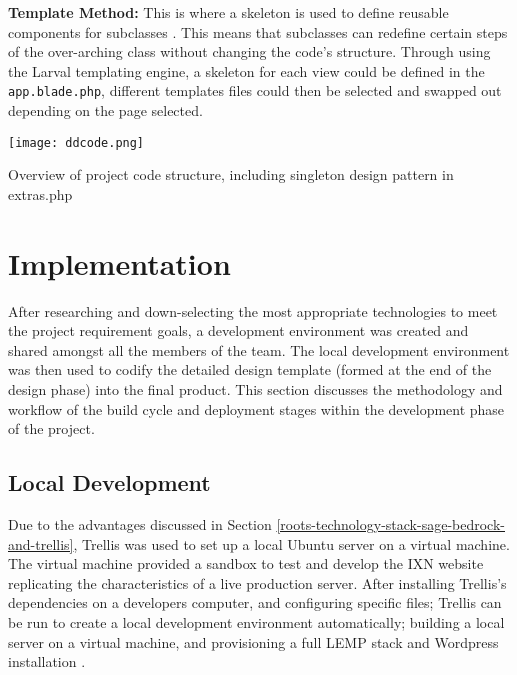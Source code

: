 \documentclass[fontsize=11pt]{extarticle}
\numberwithin{figure}{section} %
\begin{document}
\textbf{Template Method:} This is where a skeleton is used to define
reusable components for subclasses \cite{gamma1995design}. This means
that subclasses can redefine certain steps of the over-arching class
without changing the code's structure. Through using the Larval
templating engine, a skeleton for each view could be defined in the
\texttt{app.blade.php}, different templates files could then be selected
and swapped out depending on the page selected.

\begin{table}[H]
\centering
\texttt{[image: ddcode.png]}
\caption{Overview of project code structure, including singleton design pattern in extras.php}
\label{ddcode}
\end{table}

\newpage

\hypertarget{implementation}{%
\section{Implementation}\label{implementation}}

After researching and down-selecting the most appropriate technologies
to meet the project requirement goals, a development environment was
created and shared amongst all the members of the team. The local
development environment was then used to codify the detailed design
template (formed at the end of the design phase) into the final product.
This section discusses the methodology and workflow of the build cycle
and deployment stages within the development phase of the project.

\hypertarget{local-development}{%
\subsection{Local Development}\label{local-development}}

Due to the advantages discussed in Section
\ref{roots-technology-stack-sage-bedrock-and-trellis}, Trellis was used
to set up a local Ubuntu server on a virtual machine. The virtual
machine provided a sandbox to test and develop the IXN website
replicating the characteristics of a live production server. After
installing Trellis's dependencies on a developers computer, and
configuring specific files; Trellis can be run to create a local
development environment automatically; building a local server on a
virtual machine, and provisioning a full LEMP stack and Wordpress
installation \cite{p21}.
\end{document}

